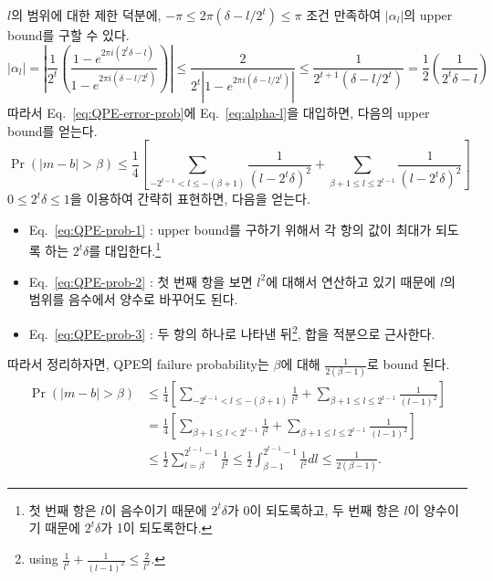 $l$의 범위에 대한 제한 덕분에, $-\pi \le 2\pi(\delta - l/2^t) \le \pi$ 조건 만족하여 $|\alpha_l|$의 upper bound를 구할 수 있다.
\begin{equation}
  \left|\alpha_l\right|=\left|\frac{1}{2^t}\left(\frac{1-e^{2 \pi i\left(2^t \delta-l\right)}}{1-e^{2 \pi i\left(\delta-l / 2^t\right)}}\right)\right| \leq \frac{2}{2^t | 1-e^{2 \pi i\left(\delta-l / 2^t\right)}|} \leq \frac{1}{2^{t+1}\left(\delta-l / 2^t\right)}  = \frac{1}{2} \left( \frac{1}{2^t \delta - l} \right) \label{eq:alpha-l}
\end{equation}
따라서 Eq.~\eqref{eq:QPE-error-prob}에 Eq.~\eqref{eq:alpha-l}을 대입하면, 다음의 upper bound를 얻는다.
\begin{equation}
\Pr(|m-b|>\beta) \leq \frac{1}{4}\left[\sum_{-2^{t-1}<l \leq-(\beta+1)} \frac{1}{\left(l-2^t \delta\right)^2}+\sum_{\beta+1 \leq l \leq 2^{t-1}} \frac{1}{\left(l-2^t \delta\right)^2}\right] 
\end{equation}
$0\le 2^t \delta \le 1$을 이용하여 간략히 표현하면, 다음을 얻는다.
\begin{itemize}
  \item Eq.~\eqref{eq:QPE-prob-1} : upper bound를 구하기 위해서 각 항의 값이 최대가 되도록 하는 $2^t \delta$를 대입한다.\footnote{첫 번째 항은 $l$이 음수이기 때문에 $2^t \delta$가 0이 되도록하고, 두 번째 항은 $l$이 양수이기 때문에 $2^t \delta$가 1이 되도록한다.}
  \item Eq.~\eqref{eq:QPE-prob-2} : 첫 번째 항을 보면 $l^2$에 대해서 연산하고 있기 때문에 $l$의 범위를 음수에서 양수로 바꾸어도 된다.
  \item Eq.~\eqref{eq:QPE-prob-3} : 두 항의 하나로 나타낸 뒤\footnote{using $ \frac{1}{l^2} + \frac{1}{(l-1)^2} \leq \frac{2}{l^2}. $}, 합을 적분으로 근사한다.
\end{itemize}
따라서 정리하자면, QPE의 failure probability는 $\beta$에 대해 $\frac{1}{2(\beta-1)}$로 bound 된다.
\begin{align}
  \Pr(|m-b|>\beta) & \leq \frac{1}{4}\left[\sum_{-2^{t-1}<l \leq-(\beta+1)} \frac{1}{l^2}+\sum_{\beta+1 \leq l \leq 2^{t-1}} \frac{1}{(l-1)^2}\right] \label{eq:QPE-prob-1}\\ 
  & =\frac{1}{4}\left[\sum_{\beta+1 \leq l<2^{t-1}} \frac{1}{l^2}+\sum_{\beta+1 \leq l \leq 2^{t-1}} \frac{1}{(l-1)^2}\right] \label{eq:QPE-prob-2}\\
  & \leq \frac{1}{2} \sum_{l=\beta}^{2^{t-1}-1} \frac{1}{l^2} \leq \frac{1}{2} \int_{\beta-1}^{2^{t-1}-1} \frac{1}{l^2}  dl \leq \frac{1}{2(\beta-1)} .\label{eq:QPE-prob-3}
\end{align}

